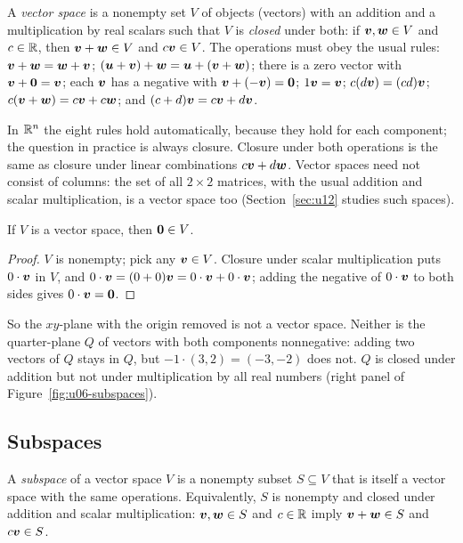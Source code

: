 \begin{definition}\label{def:u06-vspace}
A \emph{vector space} is a nonempty set $V$ of objects (vectors) with an addition and a
multiplication by real scalars such that $V$ is \emph{closed} under both: if $\boldsymbol{v},\boldsymbol{w}\in V$
and $c\in\mathbb{R}$, then $\boldsymbol{v}+\boldsymbol{w}\in V$ and $c\boldsymbol{v}\in V$. The operations must obey the usual
rules: $\boldsymbol{v}+\boldsymbol{w}=\boldsymbol{w}+\boldsymbol{v}$; $(\boldsymbol{u}+\boldsymbol{v})+\boldsymbol{w}=\boldsymbol{u}+(\boldsymbol{v}+\boldsymbol{w})$; there is a
zero vector with $\boldsymbol{v}+\boldsymbol{0}=\boldsymbol{v}$; each $\boldsymbol{v}$ has a negative with $\boldsymbol{v}+(-\boldsymbol{v})=\boldsymbol{0}$;
$1\boldsymbol{v}=\boldsymbol{v}$; $c(d\boldsymbol{v})=(cd)\boldsymbol{v}$; $c(\boldsymbol{v}+\boldsymbol{w})=c\boldsymbol{v}+c\boldsymbol{w}$; and
$(c+d)\boldsymbol{v}=c\boldsymbol{v}+d\boldsymbol{v}$.
\end{definition}

In $\mathbb{R}^n$ the eight rules hold automatically, because they hold for each component; the
question in practice is always closure. Closure under both operations is the same as closure
under linear combinations $c\boldsymbol{v}+d\boldsymbol{w}$. Vector spaces need not consist of columns:
the set of all $2\times2$ matrices, with the usual addition and scalar multiplication, is a
vector space too (Section~\ref{sec:u12} studies such spaces).

\begin{proposition}\label{prop:u06-zero}
If $V$ is a vector space, then $\boldsymbol{0}\in V$.
\end{proposition}

\begin{proof}
$V$ is nonempty; pick any $\boldsymbol{v}\in V$. Closure under scalar multiplication puts
$0\cdot\boldsymbol{v}$ in $V$, and $0\cdot\boldsymbol{v}=(0+0)\boldsymbol{v}=0\cdot\boldsymbol{v}+0\cdot\boldsymbol{v}$; adding the
negative of $0\cdot\boldsymbol{v}$ to both sides gives $0\cdot\boldsymbol{v}=\boldsymbol{0}$.
\end{proof}

So the $xy$-plane with the origin removed is not a vector space. Neither is the quarter-plane
$Q$ of vectors with both components nonnegative: adding two vectors of $Q$ stays in $Q$, but
$-1\cdot(3,2)=(-3,-2)$ does not. $Q$ is closed under addition but not under multiplication by
all real numbers (right panel of Figure~\ref{fig:u06-subspaces}).

\subsection{Subspaces}

\begin{definition}[Subspace]\label{def:u06-subspace}
A \emph{subspace} of a vector space $V$ is a nonempty subset $S\subseteq V$ that is itself a
vector space with the same operations. Equivalently, $S$ is nonempty and closed under
addition and scalar multiplication: $\boldsymbol{v},\boldsymbol{w}\in S$ and $c\in\mathbb{R}$ imply
$\boldsymbol{v}+\boldsymbol{w}\in S$ and $c\boldsymbol{v}\in S$.
\end{definition}

